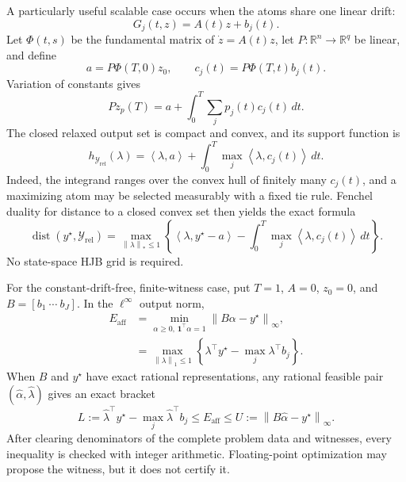 \documentclass[twoside,11pt]{article}
\newcommand{\Rel}{\mathrm{rel}}
\newcommand{\dist}{\operatorname{dist}}
\newcommand{\norm}[1]{\left\lVert #1\right\rVert}
\newcommand{\inner}[2]{\left\langle #1,#2\right\rangle}
\newcommand{\one}{\mathbf{1}}
\begin{document}
A particularly useful scalable case occurs when the atoms share one linear drift:
\begin{equation}
 G_j(t,z)=A(t)z+b_j(t).
 \label{eq:common-drift-affine-main}
\end{equation}
Let $\Phi(t,s)$ be the fundamental matrix of $\dot z=A(t)z$, let $P:\mathbb R^n\to\mathbb R^q$ be linear, and define
\begin{equation}
 a=P\Phi(T,0)z_0,
 \qquad
 c_j(t)=P\Phi(T,t)b_j(t).
 \label{eq:affine-output-data-main}
\end{equation}
Variation of constants gives
\begin{equation}
 Pz_p(T)=a+\int_0^T\sum_jp_j(t)c_j(t)\,dt.
 \label{eq:affine-variation-main}
\end{equation}
The closed relaxed output set is compact and convex, and its support function is
\begin{equation}
 h_{\mathcal Y_{\Rel}}(\lambda)
 =\inner{\lambda}{a}
 +\int_0^T\max_j\inner{\lambda}{c_j(t)}\,dt.
 \label{eq:affine-support-main}
\end{equation}
Indeed, the integrand ranges over the convex hull of finitely many $c_j(t)$, and a maximizing atom may be selected measurably with a fixed tie rule.  Fenchel duality for distance to a closed convex set then yields the exact formula
\begin{equation}
 \dist(y^\star,\mathcal Y_{\Rel})
 =\max_{\norm{\lambda}_*\le1}
 \left\{
 \inner{\lambda}{y^\star-a}
 -\int_0^T\max_j\inner{\lambda}{c_j(t)}\,dt
 \right\}.
 \label{eq:affine-exact-distance-main}
\end{equation}
No state-space HJB grid is required.

For the constant-drift-free, finite-witness case, put $T=1$, $A=0$, $z_0=0$, and $B=[b_1\ \cdots\ b_J]$.  In the $\ell^\infty$ output norm,
\begin{align}
 E_{\mathrm{aff}}
 &=\min_{\alpha\ge0,\,\one^\top\alpha=1}
   \norm{B\alpha-y^\star}_\infty,
 \label{eq:affine-primal-main}\\
 &=\max_{\norm{\lambda}_1\le1}
   \left\{\lambda^\top y^\star-
   \max_j\lambda^\top b_j\right\}.
 \label{eq:affine-dual-main}
\end{align}
When $B$ and $y^\star$ have exact rational representations, any rational feasible pair $(\widehat\alpha,\widehat\lambda)$ gives an exact bracket
\begin{equation}
 L:=\widehat\lambda^\top y^\star-
       \max_j\widehat\lambda^\top b_j
 \le E_{\mathrm{aff}}
 \le
 U:=\norm{B\widehat\alpha-y^\star}_\infty.
 \label{eq:affine-rational-bracket-main}
\end{equation}
After clearing denominators of the complete problem data and witnesses, every inequality is checked with integer arithmetic.  Floating-point optimization may propose the witness, but it does not certify it.
\end{document}
